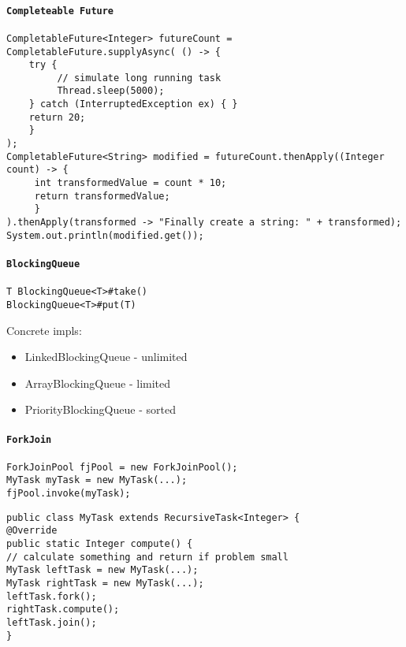 \paragraph{\texttt{Completeable Future}}
\begin{verbatim}
CompletableFuture<Integer> futureCount = CompletableFuture.supplyAsync( () -> {
    try {
         // simulate long running task 
         Thread.sleep(5000);
    } catch (InterruptedException ex) { }
    return 20; 
    }
);
CompletableFuture<String> modified = futureCount.thenApply((Integer count) -> {
     int transformedValue = count * 10;
     return transformedValue; 
     }
).thenApply(transformed -> "Finally create a string: " + transformed);
System.out.println(modified.get());
\end{verbatim}


\paragraph{\texttt{BlockingQueue}}
\begin{verbatim}
T BlockingQueue<T>#take()
BlockingQueue<T>#put(T)
\end{verbatim}
Concrete impls:
\begin{itemize}
	\item LinkedBlockingQueue - unlimited
	\item ArrayBlockingQueue - limited
	\item PriorityBlockingQueue - sorted
\end{itemize}

\paragraph{\texttt{ForkJoin}}
\begin{verbatim}
ForkJoinPool fjPool = new ForkJoinPool();
MyTask myTask = new MyTask(...);
fjPool.invoke(myTask);
\end{verbatim}
\begin{verbatim}
public class MyTask extends RecursiveTask<Integer> {
@Override
public static Integer compute() {
// calculate something and return if problem small
MyTask leftTask = new MyTask(...); 
MyTask rightTask = new MyTask(...);
leftTask.fork();
rightTask.compute();
leftTask.join();
}
\end{verbatim}
